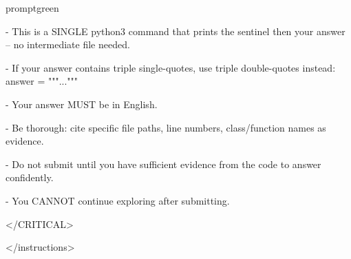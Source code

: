 \documentclass{llmxive}
\begin{document}
\begin{promptbox}{promptgreen}
{- This is a SINGLE python3 command that prints the sentinel then your answer -- no intermediate file needed.\par
- If your answer contains triple single-quotes, use triple double-quotes instead: answer = """..."""\par
- Your answer MUST be in English.\par
- Be thorough: cite specific file paths, line numbers, class/function names as evidence.\par
- Do not submit until you have sufficient evidence from the code to answer confidently.\par
- You CANNOT continue exploring after submitting.\par
\textless{}/CRITICAL\textgreater{}\par
\textless{}/instructions\textgreater{}\par
}
\end{promptbox}
\end{document}
